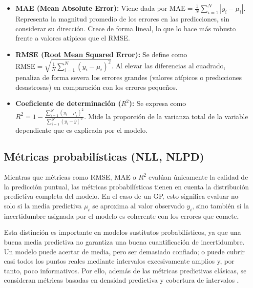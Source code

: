\begin{itemize}

    \item \textbf{MAE (Mean Absolute Error):} Viene dada por $\text{MAE} = \frac{1}{N} \sum_{i=1}^{N} |y_i - \mu_i|$.
    Representa la magnitud promedio de los errores en las predicciones, sin considerar su dirección. Crece de forma lineal, lo que lo hace más robusto frente a valores atípicos que el RMSE.
    
    \item \textbf{RMSE (Root Mean Squared Error):} Se define como $\text{RMSE} = \sqrt{\frac{1}{N} \sum_{i=1}^{N} (y_i - \mu_i)^2}$. Al elevar las diferencias al cuadrado, penaliza de forma severa los errores grandes (valores atípicos o predicciones desastrosas) en comparación con los errores pequeños.
       
    \item \textbf{Coeficiente de determinación ($R^2$):} Se expresa como $R^2 = 1 - \frac{\sum_{i=1}^{N} (y_i - \mu_i)^2}{\sum_{i=1}^{N} (y_i - \bar{y})^2}$. Mide la proporción de la varianza total de la variable dependiente que es explicada por el modelo.
    
\end{itemize}

\subsection{Métricas probabilísticas (NLL, NLPD)}

Mientras que métricas como RMSE, MAE o \(R^2\) evalúan únicamente la calidad de la
predicción puntual, las métricas probabilísticas tienen en cuenta la distribución predictiva
completa del modelo. En el caso de un GP, esto significa evaluar no solo si
la media predictiva \(\mu_i\) se aproxima al valor observado \(y_i\), sino también si la
incertidumbre asignada por el modelo es coherente con los errores que comete.

Esta distinción es importante en modelos sustitutos probabilísticos, ya que una buena media
predictiva no garantiza una buena cuantificación de incertidumbre. Un modelo puede acertar
de media, pero ser demasiado confiado; o puede cubrir casi todos los puntos reales mediante
intervalos excesivamente amplios y, por tanto, poco informativos. Por ello, además de las
métricas predictivas clásicas, se consideran métricas basadas en densidad predictiva y
cobertura de intervalos \cite{rasmussen2006gpml,gneiting2007proper,kuleshov2018accurate}.

